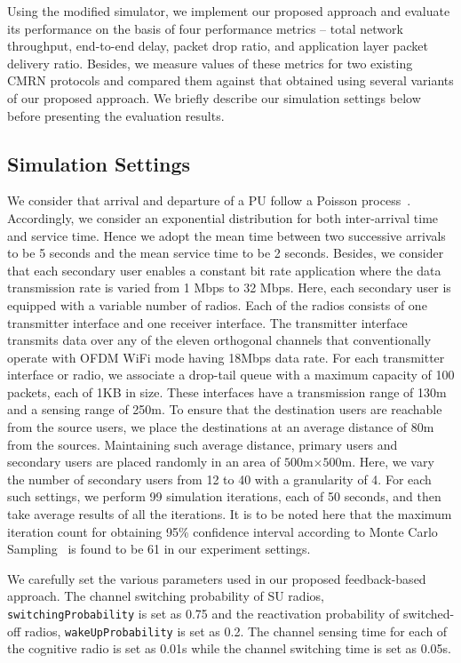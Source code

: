 \documentclass[letterpaper,conference]{IEEEtran}
\begin{document}
Using the modified simulator, we implement our proposed approach and evaluate its performance on the basis of four performance metrics -- total network throughput, end-to-end delay, packet drop ratio, and application layer packet delivery ratio. Besides, we measure values of these metrics for two existing CMRN protocols and compared them against that obtained using several variants of our proposed approach. We briefly describe our simulation settings below before presenting the evaluation results.

\subsection{Simulation Settings}

We consider that arrival and departure of a PU follow a Poisson process~\cite{heo2008mathematical}. Accordingly, we consider an exponential distribution for both inter-arrival time and service time. Hence we adopt the mean time between two successive arrivals to be 5 seconds and the mean service time to be 2 seconds. Besides, we consider that each secondary user enables a constant bit rate application where the data transmission rate is varied from 1 Mbps to 32 Mbps. Here, each secondary user is equipped with a variable number of radios. Each of the radios consists of one transmitter interface and one receiver interface. The transmitter interface transmits data over any of the eleven orthogonal channels that conventionally operate with OFDM WiFi mode having 18Mbps data rate. For each transmitter interface or radio, we associate a drop-tail queue with a maximum capacity of 100 packets, each of 1KB in size. These interfaces have a transmission range of 130m and a sensing range of 250m. To ensure that the destination users are reachable from the source users, we place the destinations at an average distance of 80m from the sources. Maintaining such average distance, primary users and secondary users are placed randomly in an area of $500$m$\times 500$m. Here, we vary the number of secondary users from 12 to 40 with a granularity of 4. For each such settings, we perform 99 simulation iterations, each of 50 seconds, and then take average results of all the iterations. It is to be noted here that the maximum iteration count for obtaining 95\% confidence interval according to Monte Carlo Sampling~\cite{winston2000simulation} is found to be 61 in our experiment settings. 

We carefully set the various parameters used in our proposed feedback-based approach. The channel switching probability of SU radios, \texttt{switchingProbability} is set as 0.75 and the reactivation probability of switched-off radios, \texttt{wakeUpProbability} is set as 0.2. The channel sensing time for each of the cognitive radio is set as 0.01s while the channel switching time is set as 0.05s.
\end{document}
